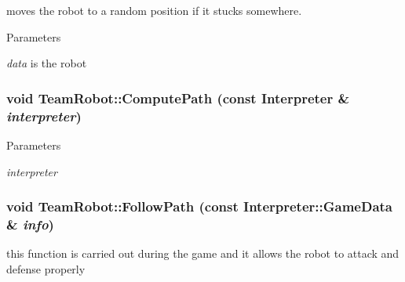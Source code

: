 moves the robot to a random position if it stucks somewhere. 


\begin{DoxyParams}{Parameters}
\item[{\em data}]is the robot \end{DoxyParams}
\hypertarget{classTeamRobot_a9ae431d9eeaa1d16fa28c636499ab553}{
\subsubsection[{ComputePath}]{\setlength{\rightskip}{0pt plus 5cm}void TeamRobot::ComputePath (const {\bf Interpreter} \& {\em interpreter})}}
\label{classTeamRobot_a9ae431d9eeaa1d16fa28c636499ab553}

\begin{DoxyParams}{Parameters}
\item[{\em interpreter}]\end{DoxyParams}
\hypertarget{classTeamRobot_a02df00aae0a514badc93a9b2593be85f}{
\subsubsection[{FollowPath}]{\setlength{\rightskip}{0pt plus 5cm}void TeamRobot::FollowPath (const {\bf Interpreter::GameData} \& {\em info})}}
\label{classTeamRobot_a02df00aae0a514badc93a9b2593be85f}


this function is carried out during the game and it allows the robot to attack and defense properly 


